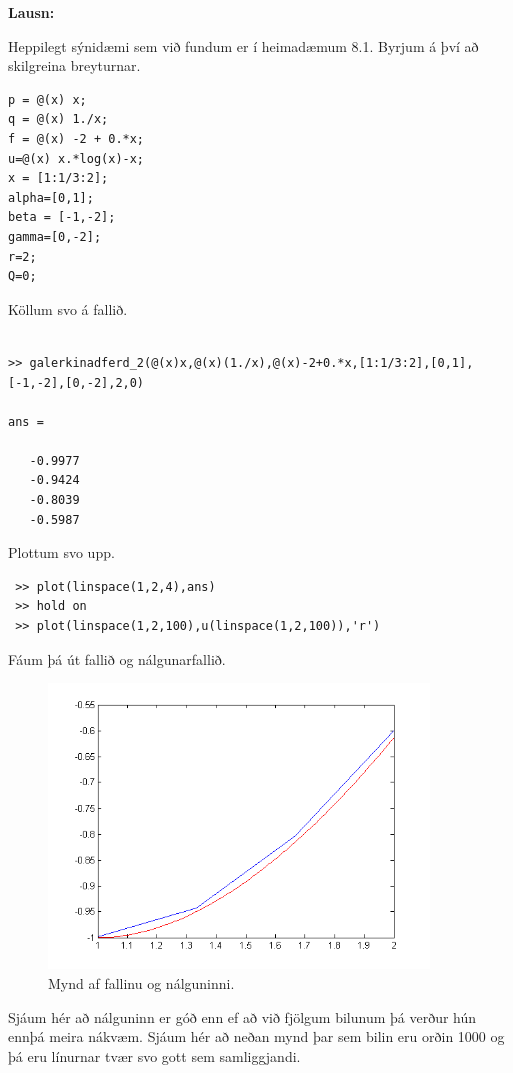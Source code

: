 \documentclass[11pt,a4paper,titlepage]{article}
\begin{document}
\par
\textbf{Lausn:}\par 
Heppilegt sýnidæmi sem við fundum er í heimadæmum 8.1. Byrjum á því að skilgreina breyturnar. 
\begin{verbatim}
p = @(x) x;
q = @(x) 1./x;
f = @(x) -2 + 0.*x;
u=@(x) x.*log(x)-x;
x = [1:1/3:2];
alpha=[0,1];
beta = [-1,-2];
gamma=[0,-2];
r=2;
Q=0;
\end{verbatim}
Köllum svo á fallið. 
\begin{verbatim}

>> galerkinadferd_2(@(x)x,@(x)(1./x),@(x)-2+0.*x,[1:1/3:2],[0,1],[-1,-2],[0,-2],2,0)

ans =

   -0.9977
   -0.9424
   -0.8039
   -0.5987
\end{verbatim}
 Plottum svo upp. 
 \begin{verbatim}
 >> plot(linspace(1,2,4),ans)
 >> hold on
 >> plot(linspace(1,2,100),u(linspace(1,2,100)),'r')
 \end{verbatim}
 
 Fáum þá út fallið og nálgunarfallið. 
 
  \begin{figure}[h!]
      \centering
      \includegraphics[width=0.9\textwidth]{nalgun1_4.png}
      \caption{Mynd af fallinu og nálguninni.}
      \label{fig:awesome_image1}
  \end{figure}
  
  Sjáum hér að nálguninn er góð enn ef að við fjölgum bilunum þá verður hún ennþá meira nákvæm.  Sjáum hér að neðan mynd þar sem bilin eru orðin 1000 og þá eru línurnar tvær svo gott sem samliggjandi. 
  
\end{document}
